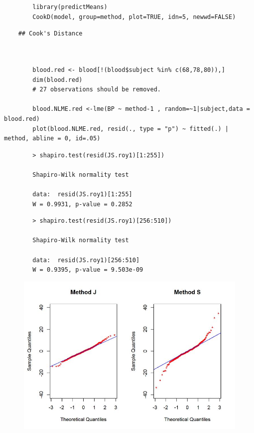 \documentclass[12pt, a4paper]{report}
\theoremstyle{plain}
\theoremstyle{definition}
\theoremstyle{remark}
\begin{document}
	\begin{framed}
		\begin{verbatim}
		library(predictMeans)
		CookD(model, group=method, plot=TRUE, idn=5, newwd=FALSE)
		\end{verbatim}
	\end{framed}
	
	
	\begin{verbatim}
	## Cook's Distance
	
	\end{verbatim}
	
	
	
	\begin{framed}
		\begin{verbatim}
		
		blood.red <- blood[!(blood$subject %in% c(68,78,80)),]
		dim(blood.red)
		# 27 observations should be removed.
		
		blood.NLME.red <-lme(BP ~ method-1 , random=~1|subject,data = blood.red)
		plot(blood.NLME.red, resid(., type = "p") ~ fitted(.) | method, abline = 0, id=.05)
		\end{verbatim}
	\end{framed}
	
	
	\begin{framed}
		\begin{verbatim}
		> shapiro.test(resid(JS.roy1)[1:255])
		
		Shapiro-Wilk normality test
		
		data:  resid(JS.roy1)[1:255]
		W = 0.9931, p-value = 0.2852
		\end{verbatim}
	\end{framed}
	
	\begin{framed}
		\begin{verbatim}
		> shapiro.test(resid(JS.roy1)[256:510])
		
		Shapiro-Wilk normality test
		
		data:  resid(JS.roy1)[256:510]
		W = 0.9395, p-value = 9.503e-09
		\end{verbatim}
	\end{framed}
	\begin{figure}[h!]
		\centering
		\includegraphics[width=0.9\linewidth]{images/Resid-newplot2}
		
	\end{figure}
	
\end{document}
